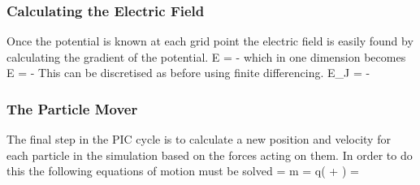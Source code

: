 \subsubsection{Calculating the Electric Field}
Once the potential is known at each grid point the electric field is easily found by calculating the gradient of the potential.
\be 
E = - \nabla \psi
\ee 
which in one dimension becomes
\be 
E = - 
\label{eq:electricfield}
\ee
This can be discretised as before using finite differencing.
\be
E_J = -
\ee
\subsubsection{The Particle Mover}
The final step in the PIC cycle is to calculate a new position and velocity for each particle in the simulation based on the forces acting on them. In order to do this the following equations of motion must be solved 
\be 
{}  = m  = q( +  \times {})
\label{eq:diff1}
\ee 
\be 
{} = 
\label{eq:diff2}
\ee 
%





